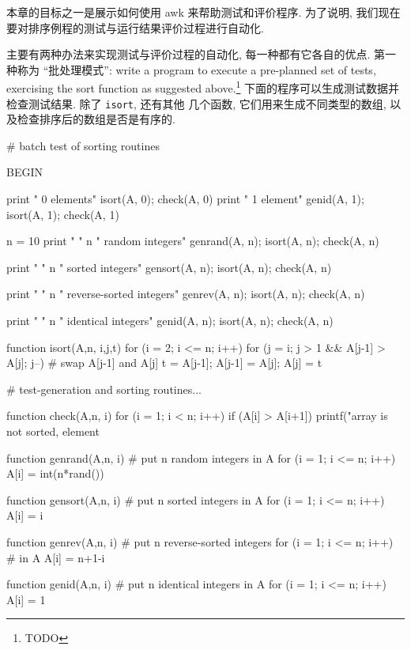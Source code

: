 本章的目标之一是展示如何使用 awk 来帮助测试和评价程序. 为了说明, 我们现在
要对排序例程的测试与运行结果评价过程进行自动化.

主要有两种办法来实现测试与评价过程的自动化, 每一种都有它各自的优点. 第一 
种称为 ``批处理模式'': write a program to execute a pre-planned set of
tests, exercising the sort function as suggested above.\footnote{TODO}
下面的程序可以生成测试数据并检查测试结果. 除了 \texttt{isort}, 还有其他
几个函数, 它们用来生成不同类型的数组, 以及检查排序后的数组是否是有序的.
\begin{awkcode}
    # batch test of sorting routines

    BEGIN {
        print "    0 elements"
        isort(A, 0); check(A, 0)    
        print "    1 element"
        genid(A, 1); isort(A, 1); check(A, 1)
        
        n = 10
        print "    " n " random integers"
        genrand(A, n); isort(A, n); check(A, n)
        
        print "    " n " sorted integers"
        gensort(A, n); isort(A, n); check(A, n)
        
        print "    " n " reverse-sorted integers"
        genrev(A, n); isort(A, n); check(A, n)
        
        print "    " n " identical integers"
        genid(A, n); isort(A, n); check(A, n)
    }

    function isort(A,n,     i,j,t) {
        for (i = 2; i <= n; i++)
            for (j = i; j > 1 && A[j-1] > A[j]; j--) {
                # swap A[j-1] and A[j]
                t = A[j-1]; A[j-1] = A[j]; A[j] = t
            }
    }

\end{awkcode}
\begin{awkcode}
    # test-generation and sorting routines...

    function check(A,n,   i) {
        for (i = 1; i < n; i++)
            if (A[i] > A[i+1])
                printf("array is not sorted, element %
    }

    function genrand(A,n,  i) { # put n random integers in A
        for (i = 1; i <= n; i++)
            A[i] = int(n*rand())
    }

    function gensort(A,n,  i) { # put n sorted integers in A
        for (i = 1; i <= n; i++)
            A[i] = i
    }

    function genrev(A,n,  i) {  # put n reverse-sorted integers
        for (i = 1; i <= n; i++)  # in A
            A[i] = n+1-i
    }

    function genid(A,n,  i) {   # put n identical integers in A
        for (i = 1; i <= n; i++)
            A[i] = 1
    }
\end{awkcode}

